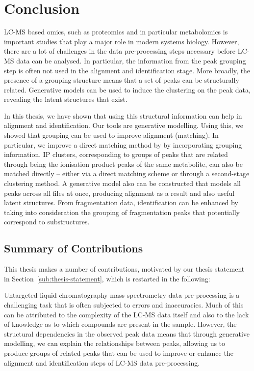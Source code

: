 \chapter{Conclusion}
\label{c:conclusion}

LC-MS based omics, such as proteomics and in particular metabolomics is important studies that play a major role in modern systems biology. However, there are a lot of challenges in the data pre-processing steps necessary before LC-MS data can be analysed. In particular, the information from the peak grouping step is often not used in the alignment and identification stage. More broadly, the presence of a grouping structure means that a set of peaks can be structurally related. Generative models can be used to induce the clustering on the peak data, revealing the latent structures that exist. 

In this thesis, we have shown that using this structural information can help in alignment and identification. Our tools are generative modelling. Using this, we showed that grouping can be used to improve alignment (matching). In particular, we improve a direct matching method by by incorporating grouping information. IP clusters, corresponding to groups of peaks that are related through being the ionisation product peaks of the same metabolite, can also be matched directly -- either via a direct matching scheme or through a second-stage clustering method. A generative model also can be constructed that models all peaks across all files at once, producing alignment as a result and also useful latent structures. From fragmentation data, identification can be enhanced by taking into consideration the grouping of fragmentation peaks that potentially correspond to substructures.

\section{Summary of Contributions}

This thesis makes a number of contributions, motivated by our thesis statement in Section~\ref{sub:thesis-statement}, which is restarted in the following:

Untargeted liquid chromatography mass spectrometry data pre-processing is a challenging task that is often subjected to errors and inaccuracies. Much of this can be attributed to the complexity of the LC-MS data itself and also to the lack of knowledge as to which compounds are present in the sample. However, the structural dependencies in the observed peak data means that through generative modelling, we can explain the relationships between peaks, allowing us to produce groups of related peaks that can be used to improve or enhance the alignment and identification steps of LC-MS data pre-processing.

